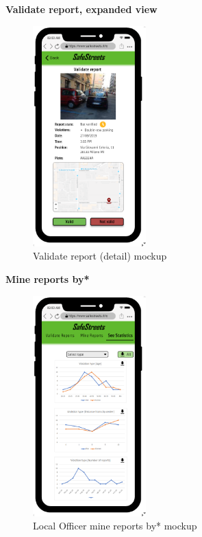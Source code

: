 					\vspace{-1mm}
					\begin{center}
						{\small \textbf{Validate report, expanded view}}
					\end{center}
					\vspace{-5mm}
					\begin{figure}[!h]
						\centering
						\includegraphics[height=8.5cm]{images/MockUp/Authority/LocalOfficer/ValidateReportExpanded.png}
						\caption{Validate report (detail) mockup}
					\end{figure}
					\clearpage
					\vspace{-2mm}
					\begin{center}
						{\small \textbf{Mine reports by*}}
					\end{center}
					\vspace{-5mm}
					\begin{figure}[!h]
						\centering
						\includegraphics[height=8.5cm]{images/MockUp/Authority/LocalOfficer/SeeStatistics.png}
						\caption{Local Officer mine reports by* mockup}
					\end{figure}
